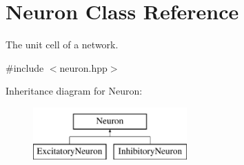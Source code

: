 \hypertarget{classNeuron}{\section{Neuron Class Reference}
\label{classNeuron}
}


The unit cell of a network.  




{\ttfamily \#include $<$neuron.\-hpp$>$}

Inheritance diagram for Neuron\-:\begin{figure}[H]
\begin{center}
\leavevmode
\includegraphics[height=2.000000cm]{classNeuron}
\end{center}
\end{figure}
